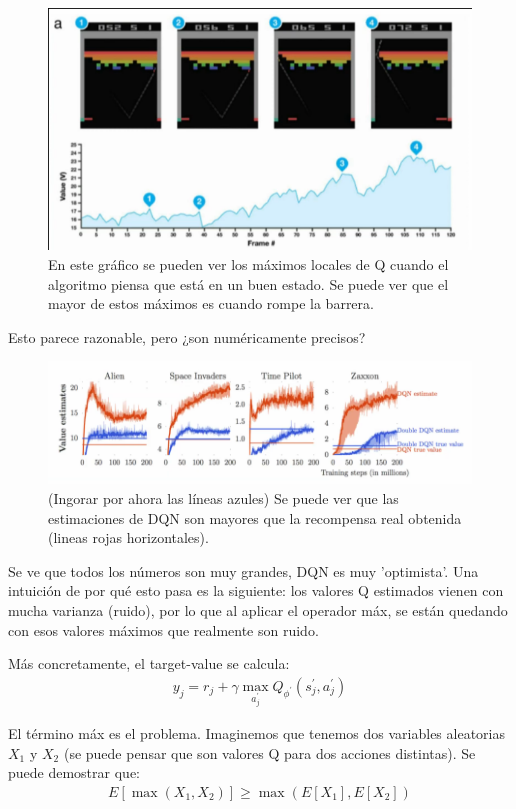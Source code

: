 \begin{figure}[H]
	\centering
	\includegraphics[width=0.5\linewidth]{figures/2020-06-16-180133_570x326_scrot.png}
    \caption{En este gráfico se pueden ver los máximos locales de Q cuando el algoritmo piensa
    que está en un buen estado. Se puede ver que el mayor de estos máximos es cuando rompe la
barrera.}
\label{fig:breakout}
\end{figure} 

Esto parece razonable, pero ¿son numéricamente precisos?

\begin{figure}[H]
	\centering
	\includegraphics[width=0.8\linewidth]{figures/2020-06-16-180346_876x254_scrot.png}
    \caption{(Ingorar por ahora las líneas azules) Se puede ver que las estimaciones de DQN
    son mayores que la recompensa real obtenida (lineas rojas horizontales).}
    \label{fig:estimaciones}
\end{figure}

Se ve que todos los números son muy grandes, DQN es muy 'optimista'. Una intuición de por qué
esto pasa es la siguiente: los valores Q estimados vienen con mucha varianza (ruido), por lo que
al aplicar el operador máx, se están quedando con esos valores máximos que realmente son ruido.

Más concretamente, el target-value se calcula:
\begin{align}
y _ { j } = r _ { j } + \gamma \operatorname { max } _ { a _ { j } ^ { \prime } } Q _ { \phi ^ { \prime } } ( s _ { j } ^ { \prime } , a _ { j } ^ { \prime } )
\end{align}

El término máx es el problema. Imaginemos que tenemos dos variables aleatorias $X_1$ y
$X_2$ (se puede pensar que son valores Q para dos acciones distintas). Se puede demostrar que:
\begin{align}
E [ \operatorname { max } ( X _ { 1 } , X _ { 2 } ) ] \geq \operatorname { max } ( E [ X _ { 1 } ] , E [ X _ { 2 } ] )
\end{align}

